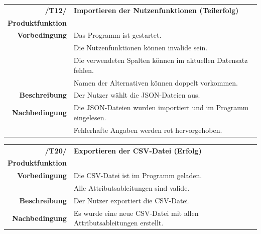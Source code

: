 \documentclass{article}
\begin{document}
\begin{table}[H]
\begin{tabularx}{\textwidth}{rX}
\vspace{1mm}
\textbf{/T12/}         & \textbf{Importieren der Nutzenfunktionen (Teilerfolg)} \\ \vspace{1mm}
\textbf{Produktfunktion} & \nameref{sec:f:Alternativen importieren} \\ \vspace{1mm}
\textbf{Vorbedingung}  & Das Programm ist gestartet. \\ & Die Nutzenfunktionen können invalide sein. \\ & Die verwendeten Spalten können im aktuellen Datensatz fehlen. \\ & Namen der Alternativen können doppelt vorkommen.
\vspace{1mm} \\
\textbf{Beschreibung}  & Der Nutzer wählt die JSON-Dateien aus. \\
\textbf{Nachbedingung} & Die JSON-Dateien wurden importiert und im Programm eingelesen. \\ & Fehlerhafte Angaben werden rot hervorgehoben.
\end{tabularx}
\end{table}

\begin{table}[H]
\begin{tabularx}{\textwidth}{rX}
 \vspace{1mm}
\textbf{/T20/}         & \textbf{Exportieren der CSV-Datei (Erfolg)} \\ \vspace{1mm}
\textbf{Produktfunktion} & \nameref{sec:f:CSV-Datei exportieren}\\
\textbf{Vorbedingung}  & Die CSV-Datei ist im Programm geladen. \\ \vspace{1mm} & Alle Attributsableitungen sind valide. \\ \vspace{1mm}
\textbf{Beschreibung}  & Der Nutzer exportiert die CSV-Datei. \\
\textbf{Nachbedingung} & Es wurde eine neue CSV-Datei mit allen Attributsableitungen erstellt.
\end{tabularx}
\end{table}
\end{document}
